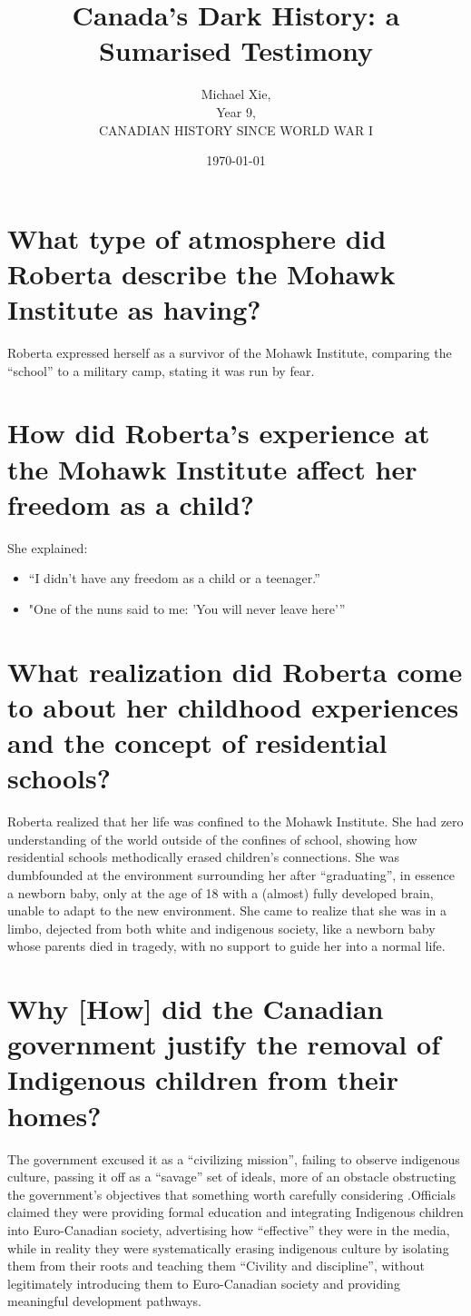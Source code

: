 \documentclass{article}
\title{Canada's Dark History: a Sumarised Testimony}
\author{Michael Xie, \\
Year 9, \\
CANADIAN HISTORY SINCE WORLD WAR I
}
\date{\today}
\begin{document}
\maketitle

\section{What type of atmosphere did Roberta describe the Mohawk Institute as having?}
Roberta expressed herself as a survivor of the Mohawk Institute, comparing the “school” to a military camp, stating it was run by fear. 

\section{How did Roberta’s experience at the Mohawk Institute affect her freedom as a child?}
She explained:
\begin{itemize}
    \item “I didn’t have any freedom as a child or a teenager.”
    \item "One of the nuns said to me: 'You will never leave here'”
\end{itemize}

\section{What realization did Roberta come to about her childhood experiences and the concept of residential schools?}
Roberta realized that her life was confined to the Mohawk Institute. She had zero understanding of the world outside of the confines of school, showing how residential schools methodically erased children’s connections. She was dumbfounded at the environment surrounding her after “graduating”, in essence a newborn baby, only at the age of 18 with a (almost) fully developed brain, unable to adapt to the new environment. She came to realize that she was in a limbo, dejected from both white and indigenous society, like a newborn baby whose parents died in tragedy, with no support to guide her into a normal life.

\section{Why [How] did the Canadian government justify the removal of Indigenous children from their homes?}
The government excused it as a “civilizing mission”, failing to observe indigenous culture, passing it off as a “savage” set of ideals, more of an obstacle obstructing the government’s objectives that something worth carefully considering .Officials claimed they were providing formal education and integrating Indigenous children into Euro-Canadian society, advertising how “effective” they were in the media, while in reality they were systematically erasing indigenous culture by isolating them from their roots and teaching them “Civility and discipline”, without legitimately introducing them to Euro-Canadian society and providing meaningful development pathways.
\end{document}
